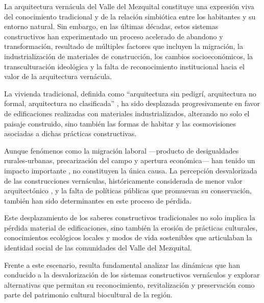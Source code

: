 La arquitectura vernácula del Valle del Mezquital constituye una expresión viva del conocimiento tradicional y de la relación simbiótica entre los habitantes y su entorno natural. Sin embargo, en las últimas décadas, estos sistemas constructivos han experimentado un proceso acelerado de abandono y transformación, resultado de múltiples factores que incluyen la migración, la industrialización de materiales de construcción, los cambios socioeconómicos, la transculturación ideológica y la falta de reconocimiento institucional hacia el valor de la arquitectura vernácula.

La vivienda tradicional, definida como ``arquitectura sin pedigrí, arquitectura no formal, arquitectura no clasificada'' \citep[p. 9]{rudofsky1976arquitectura}, ha sido desplazada progresivamente en favor de edificaciones realizadas con materiales industrializados, alterando no solo el paisaje construido, sino también las formas de habitar y las cosmovisiones asociadas a dichas prácticas constructivas.

Aunque fenómenos como la migración laboral —producto de desigualdades rurales-urbanas, precarización del campo y apertura económica— han tenido un impacto importante \citep{monroy2009, boils2010dadho}, no constituyen la única causa. La percepción desvalorizada de las construcciones vernáculas, históricamente considerada de menor valor arquitectónico \citep[p. 2]{torrez1999revista}, y la falta de políticas públicas que promuevan su conservación, también han sido determinantes en este proceso de pérdida.

Este desplazamiento de los saberes constructivos tradicionales no solo implica la pérdida material de edificaciones, sino también la erosión de prácticas culturales, conocimientos ecológicos locales y modos de vida sostenibles que articulaban la identidad social de las comunidades del Valle del Mezquital.

Frente a este escenario, resulta fundamental analizar las dinámicas que han conducido a la desvalorización de los sistemas constructivos vernáculos y explorar alternativas que permitan su reconocimiento, revitalización y preservación como parte del patrimonio cultural biocultural de la región.
